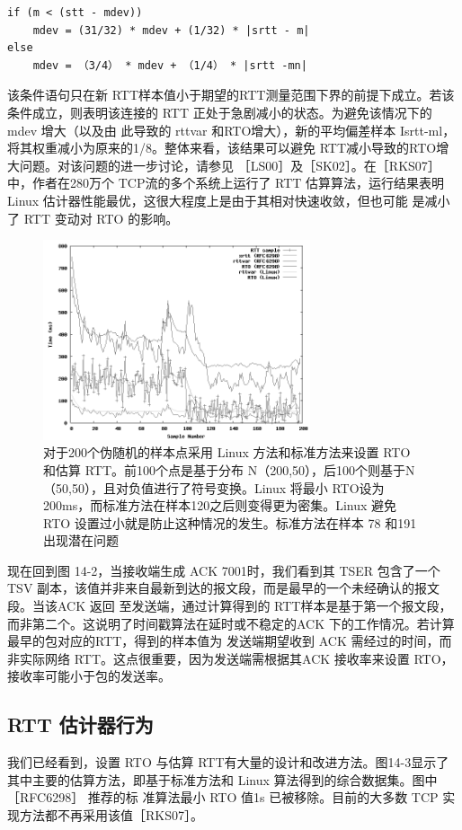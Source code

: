 \begin{lstlisting}[]
if (m < (stt - mdev))
    mdev = (31/32) * mdev + (1/32) * |srtt - m|
else
    mdev = （3/4） * mdev + （1/4） * |srtt -mn|
\end{lstlisting}

该条件语句只在新 RTT样本值小于期望的RTT测量范围下界的前提下成立。若该条件成立，则表明该连接的 RTT 正处于急剧减小的状态。为避免该情况下的 mdev 增大（以及由
此导致的 rttvar 和RTO增大），新的平均偏差样本 Isrtt-ml，将其权重减小为原来的1/8。整体来看，该结果可以避免 RTT减小导致的RTO增大问题。对该问题的进一步讨论，请参见
［LS00］及［SK02］。在［RKS07］中，作者在280万个 TCP流的多个系统上运行了 RTT 估算算法，运行结果表明 Linux 估计器性能最优，这很大程度上是由于其相对快速收敛，但也可能
是减小了 RTT 变动对 RTO 的影响。

\begin{figure}[!htb]
    \centering
	\includegraphics[width=0.7\textwidth]{imgs/14/14-3.png}
	\caption{对于200个伪随机的样本点采用 Linux 方法和标准方法来设置 RTO 和估算 RTT。前100个点是基于分布 N（200,50），后100个则基于N（50,50），且对负值进行了符号变换。Linux 将最小
    RTO设为200ms，而标准方法在样本120之后则变得更为密集。Linux 避免 RTO 设置过小就是防止这种情况的发生。标准方法在样本 78 和191 出现潜在问题}
\end{figure}

现在回到图 14-2，当接收端生成 ACK 7001时，我们看到其 TSER 包含了一个 TSV 副本，该值并非来自最新到达的报文段，而是最早的一个未经确认的报文段。当该ACK 返回
至发送端，通过计算得到的 RTT样本是基于第一个报文段，而非第二个。这说明了时间戳算法在延时或不稳定的ACK 下的工作情况。若计算最早的包对应的RTT，得到的样本值为
发送端期望收到 ACK 需经过的时间，而非实际网络 RTT。这点很重要，因为发送端需根据其ACK 接收率来设置 RTO，接收率可能小于包的发送率。

\subsection{RTT 估计器行为}
我们已经看到，设置 RTO 与估算 RTT有大量的设计和改进方法。图14-3显示了其中主要的估算方法，即基于标准方法和 Linux 算法得到的综合数据集。图中［RFC6298］ 推荐的标
准算法最小 RTO 值1s 已被移除。目前的大多数 TCP 实现方法都不再采用该值［RKS07］。

